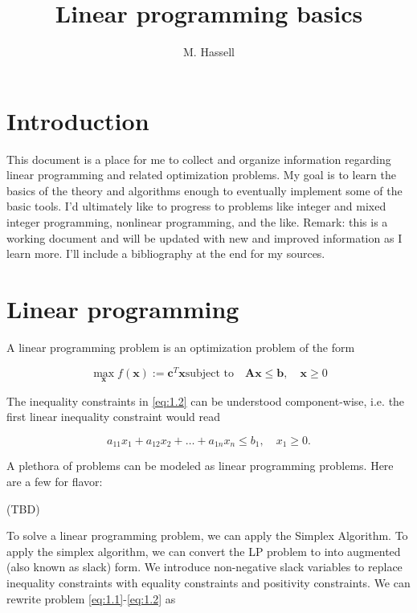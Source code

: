 \documentclass[12pt,english]{article}
\title{Linear programming basics}
\author{M. Hassell}
\begin{document}
\maketitle

\section{Introduction}\label{sec:1}

This document is a place for me to collect and organize information regarding linear programming and related optimization problems.  My goal is to learn the basics of the theory and algorithms enough to eventually implement some of the basic tools.  I'd ultimately like to progress to problems like integer and mixed integer programming, nonlinear programming, and the like.  Remark: this is a working document and will be updated with new and improved information as I learn more.   I'll include a bibliography at the end for my sources.

\section{Linear programming}\label{sec:2}

A linear programming problem is an optimization problem of the form

\begin{subequations}
\begin{equation}\label{eq:1.1}
\max_\mathbf{x} f(\mathbf x)  := \mathbf{c}^T \mathbf{x}
\end{equation}
\begin{equation}\label{eq:1.2}
\text{subject to} \quad \mathbf{A}\mathbf{x} \leq \mathbf{b}, \quad \mathbf{x}\geq 0
\end{equation}
\end{subequations}

The inequality constraints in \eqref{eq:1.2} can be understood component-wise, i.e. the first linear inequality constraint would read

$$
a_{11}x_1 + a_{12}x_2 + \dots + a_{1n}x_n \leq b_1, \quad x_1 \geq 0.
$$

A plethora of problems can be modeled as linear programming problems.  Here are a few for flavor:

(TBD)

To solve a linear programming problem, we can apply the Simplex Algorithm.   To apply the simplex algorithm, we can convert the LP problem to into augmented (also known as slack) form.  We introduce non-negative slack variables to replace inequality constraints with equality constraints and positivity constraints.   We can rewrite problem \eqref{eq:1.1}-\eqref{eq:1.2} as
\end{document}
